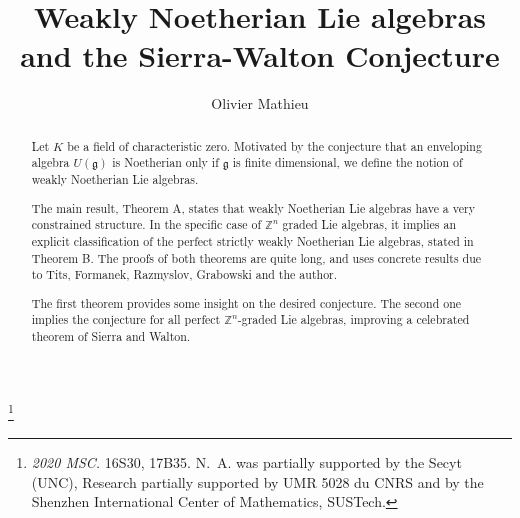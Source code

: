 \documentclass[11pt, letterpaper, reqno]{amsart}
\theoremstyle{definition}
\newcommand{\Z}{{\mathbb Z}}
\newcommand{\fg}{\mathfrak{g}}
\begin{document}
\title[Weakly Noetherian  Lie algebras]{Weakly Noetherian   Lie algebras\\and the Sierra-Walton Conjecture}


\author[O. Mathieu]{Olivier Mathieu}
\address[O.~Mathieu]{CNRS,
Institut Ca\-mille Jordan
UMR 5028 du CNRS, 
Universit\'e Claude Bernard Lyon
69622 Villeurbanne Cedex, France}



\address{
SUSTech, Shenzhen International Center for Mathematics, Shenzhen, China}

\begin{abstract} Let $K$ be a field of characteristic zero. Motivated by the conjecture that an enveloping algebra
$U(\fg)$ is Noetherian only if $\fg$ is finite dimensional, we define the notion of weakly Noetherian Lie algebras. 



The main result, Theorem A, states that weakly Noetherian Lie algebras have a very constrained structure. In the specific case of $\Z^n$ graded Lie algebras, it implies an explicit classification of the perfect strictly weakly Noetherian Lie algebras, stated in Theorem B. The proofs of both theorems are quite long, and uses concrete results due to  Tits,
Formanek, Razmyslov, Grabowski and the  author.

The first theorem provides some insight on the desired conjecture. The second one implies the  conjecture for
all perfect $\Z^n$-graded Lie algebras, improving a celebrated theorem of Sierra and Walton.

\end{abstract}

\thanks{\noindent  \emph{2020 MSC.} 16S30, 17B35.
N.~A. was  partially supported by the Secyt (UNC),
Research  partially supported
by UMR 5028 du CNRS and
by the Shenzhen International Center of Mathematics, SUSTech.}

\maketitle
\setcounter{tocdepth}{2}
\tableofcontents
\end{document}
